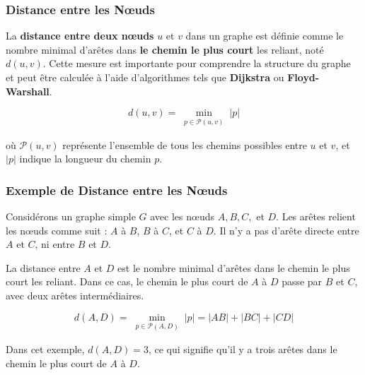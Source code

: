 \begin{frame}
\frametitle{Distance entre les Nœuds}

\begin{tcolorbox}[colback=orange!5,colframe=orange!100!black, title=Distance entre les Nœuds]
La \textbf{distance entre deux nœuds} \( u \) et \( v \) dans un graphe est définie comme le nombre minimal d'arêtes dans \textbf{le chemin le plus court} les reliant, noté \( d(u, v) \). Cette mesure est importante pour comprendre la structure du graphe et peut être calculée à l'aide d'algorithmes tels que \textbf{Dijkstra} ou \textbf{Floyd-Warshall}.

\[
d(u, v) = \min_{\substack{p \in \mathcal{P}(u, v)}} |p|
\]

où \( \mathcal{P}(u, v) \) représente l'ensemble de tous les chemins possibles entre \( u \) et \( v \), et \( |p| \) indique la longueur du chemin \( p \).
\end{tcolorbox}

\end{frame}


\begin{frame}
\frametitle{Exemple de Distance entre les Nœuds}

\begin{tcolorbox}[colback=orange!5,colframe=orange!100!black, title=Exemple de Distance entre les Nœuds]
Considérons un graphe simple \( G \) avec les nœuds \( A, B, C, \) et \( D \). Les arêtes relient les nœuds comme suit : \( A \) à \( B \), \( B \) à \( C \), et \( C \) à \( D \). Il n'y a pas d'arête directe entre \( A \) et \( C \), ni entre \( B \) et \( D \).

La distance entre \( A \) et \( D \) est le nombre minimal d'arêtes dans le chemin le plus court les reliant. Dans ce cas, le chemin le plus court de \( A \) à \( D \) passe par \( B \) et \( C \), avec deux arêtes intermédiaires.

\[
d(A, D) = \min_{\substack{p \in \mathcal{P}(A, D)}} |p| = |AB| + |BC| + |CD|
\]

Dans cet exemple, \( d(A, D) = 3 \), ce qui signifie qu'il y a trois arêtes dans le chemin le plus court de \( A \) à \( D \).
\end{tcolorbox}

\end{frame}